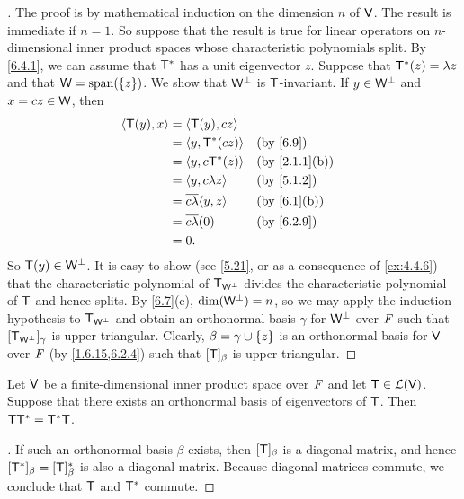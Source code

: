 \begin{proof}[]
	The proof is by mathematical induction on the dimension \(n\) of \(\mathsf{V}\).
	The result is immediate if \(n = 1\).
	So suppose that the result is true for linear operators on \(n\)-dimensional inner product spaces whose characteristic polynomials split.
	By \cref{6.4.1}, we can assume that \(\mathsf{T}^*\) has a unit eigenvector \(z\).
	Suppose that \(\mathsf{T}^*(z) = \lambda z\) and that \(\W = \spn{\set{z}}\).
	We show that \(\mathsf{W}^{\perp}\) is \(\mathsf{T}\)-invariant.
	If \(y \in \mathsf{W}^{\perp}\) and \(x = cz \in \mathsf{W}\), then
	\begin{align*}
		\inn{\T(y), x} & = \inn{\T(y), cz}                                \\
		               & = \inn{y, \T^*(cz)}           &  & \by{6.9}      \\
		               & = \inn{y, c \T^*(z)}          &  & \by{2.1.1}[b] \\
		               & = \inn{y, c \lambda z}        &  & \by{5.1.2}    \\
		               & = \conj{c \lambda} \inn{y, z} &  & \by{6.1}[b]   \\
		               & = \conj{c \lambda} (0)        &  & \by{6.2.9}    \\
		               & = 0.
	\end{align*}
	So \(\mathsf{T}(y) \in \mathsf{W}^{\perp}\).
	It is easy to show (see \cref{5.21}, or as a consequence of \cref{ex:4.4.6}) that the characteristic polynomial of \(\mathsf{T}_{\mathsf{W}^{\perp}}\) divides the characteristic polynomial of \(\mathsf{T}\) and hence splits.
	By \cref{6.7}(c), \(\dim(\mathsf{W}^{\perp}) = n\), so we may apply the induction hypothesis to \(\mathsf{T}_{\mathsf{W}^{\perp}}\) and obtain an orthonormal basis \(\gamma\) for \(\mathsf{W}^{\perp}\) over \(\mathit{F}\) such that \([\mathsf{T}_{\mathsf{W}^{\perp}}]_{\gamma}\) is upper triangular.
	Clearly, \(\beta = \gamma \cup \left\lbrace z\right\rbrace\) is an orthonormal basis for \(\mathsf{V}\) over \(\mathit{F}\) (by \cref{1.6.15,6.2.4}) such that \([\mathsf{T}]_{\beta}\) is upper triangular.
\end{proof}

\begin{cor}\label{6.4.2}
	Let \(\mathsf{V}\) be a finite-dimensional inner product space over \(\mathit{F}\) and let \(\mathsf{T} \in \mathcal{L}(\mathsf{V})\).
	Suppose that there exists an orthonormal basis of eigenvectors of \(\mathsf{T}\).
	Then \(\mathsf{T} \mathsf{T}^* = \mathsf{T}^* \mathsf{T}\).
\end{cor}

\begin{proof}[]
	If such an orthonormal basis \(\beta\) exists, then \([\mathsf{T}]_{\beta}\) is a diagonal matrix, and hence \([\mathsf{T}^*]_{\beta} = [\mathsf{T}]_{\beta}^*\) is also a diagonal matrix.
	Because diagonal matrices commute, we conclude that \(\mathsf{T}\) and \(\mathsf{T}^*\) commute.
\end{proof}

